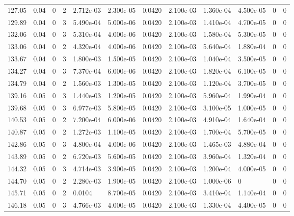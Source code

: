 \documentclass[preview]{standalone}
\begin{document}
{{{{{\begin{tabular}{L{1.2cm}C{1.2cm} C{0.3cm}C{0.5cm} C{1.4cm}C{1.4cm} C{1.4cm}C{1.4cm} C{1.6cm}C{1.6cm} C{1.6cm}C{1.6cm}}
  127.05  &  0.04  & 0     &  2 &  2.712e-03  & 2.300e-05  &  0.0420&   2.100e-03& 1.360e-04 & 4.500e-05   &  0 & 0  \\ 
  129.89  &  0.04  & 0     &  3 &  5.490e-04  & 5.000e-06  &  0.0420&   2.100e-03& 1.410e-04 & 4.700e-05   &  0 & 0  \\ 
  132.06  &  0.04  & 0     &  3 &  5.310e-04  & 4.000e-06  &  0.0420&   2.100e-03& 1.580e-04 & 5.300e-05   &  0 & 0  \\ 
  133.06  &  0.04  & 0     &  2 &  4.320e-04  & 4.000e-06  &  0.0420&   2.100e-03& 5.640e-04 & 1.880e-04   &  0 & 0  \\ 
  133.67  &  0.04  & 0     &  3 &  1.800e-03  & 1.500e-05  &  0.0420&   2.100e-03& 1.040e-04 & 3.500e-05   &  0 & 0  \\ 
  134.27  &  0.04  & 0     &  3 &  7.370e-04  & 6.000e-06  &  0.0420&   2.100e-03& 1.820e-04 & 6.100e-05   &  0 & 0  \\ 
  134.79  &  0.04  & 0     &  2 &  1.560e-03  & 1.300e-05  &  0.0420&   2.100e-03& 1.120e-04 & 3.700e-05   &  0 & 0  \\ 
  139.16  &  0.05  & 0     &  3 &  1.440e-03  & 1.200e-05  &  0.0420&   2.100e-03& 5.960e-04 & 1.990e-04   &  0 & 0  \\ 
  139.68  &  0.05  & 0     &  3 &  6.977e-03  & 5.800e-05  &  0.0420&   2.100e-03& 3.100e-05 & 1.000e-05   &  0 & 0  \\ 
  140.53  &  0.05  & 0     &  2 &  7.200e-04  & 6.000e-06  &  0.0420&   2.100e-03& 4.910e-04 & 1.640e-04   &  0 & 0  \\ 
  140.87  &  0.05  & 0     &  2 &  1.272e-03  & 1.100e-05  &  0.0420&   2.100e-03& 1.700e-04 & 5.700e-05   &  0 & 0  \\ 
  142.86  &  0.05  & 0     &  3 &  4.800e-04  & 4.000e-06  &  0.0420&   2.100e-03& 1.465e-03 & 4.880e-04   &  0 & 0  \\ 
  143.89  &  0.05  & 0     &  2 &  6.720e-03  & 5.600e-05  &  0.0420&   2.100e-03& 3.960e-04 & 1.320e-04   &  0 & 0  \\ 
  144.32  &  0.05  & 0     &  3 &  4.714e-03  & 3.900e-05  &  0.0420&   2.100e-03& 1.200e-04 & 4.000e-05   &  0 & 0  \\ 
  144.70  &  0.05  & 0     &  2 &  2.280e-03  & 1.900e-05  &  0.0420&   2.100e-03& 1.000e-06 & 0   &  0 & 0  \\ 
  145.71  &  0.05  & 0     &  2 &  0.0104  & 8.700e-05  &  0.0420&   2.100e-03& 3.410e-04 & 1.140e-04   &  0 & 0  \\ 
  146.18  &  0.05  & 0     &  3 &  4.766e-03  & 4.000e-05  &  0.0420&   2.100e-03& 1.330e-04 & 4.400e-05   &  0 & 0  \\ 

\end{tabular}}}}}}
\end{document}
